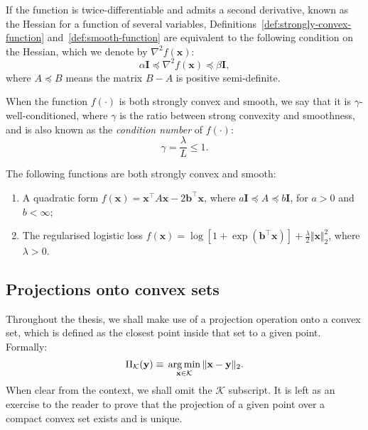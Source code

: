 If the function is twice-differentiable and admits a second derivative, known as the Hessian for a function of several variables, Definitions~\ref{def:strongly-convex-function} and~\ref{def:smooth-function} are equivalent to the following condition on the Hessian, which we denote by $\nabla^2 f(\mathbf{x})$:
\begin{equation}
\alpha\mathbf{I} \preceq \nabla^2 f(\mathbf{x}) \preceq \beta\mathbf{I},
\end{equation}
where $A \preceq B$ means the matrix $B - A$ is positive semi-definite.

When the function $f(\cdot)$ is both strongly convex and smooth, we say that it is $\gamma$-well-conditioned, where $\gamma$ is the ratio between strong convexity and smoothness, and is also known as the \emph{condition number} of $f(\cdot)$:
\begin{equation}
\gamma = \frac{\lambda}{L} \leq 1.
\end{equation}
\begin{example}
 The following functions are both strongly convex and smooth:
\begin{enumerate}
	\item A quadratic form $f(\mathbf{x}) = \mathbf{x}^\top A \mathbf{x} - 2\mathbf{b}^\top\mathbf{x}$, where $a\mathbf{I} \preceq A \preceq b\mathbf{I}$, for $a > 0$ and $b < \infty$;
	\item The regularised logistic loss $f(\mathbf{x}) = \log[1 + \exp(\mathbf{b}^\top\mathbf{x})] + \frac{\lambda}{2}\Vert\mathbf{x}\Vert_2^2$, where $\lambda > 0$.
\end{enumerate}
\end{example}

\subsection{Projections onto convex sets}
\label{sec:euclidean-projections}

Throughout the thesis, we shall make use of a projection operation onto a convex set, which is defined as the closest point inside that set to a given point. Formally:
\begin{equation}
  \Pi_\mathcal{K}(\mathbf{y})
  \equiv \, \operatorname*{arg\,min}_{\mathbf{x} \in \mathcal{K}} \Vert \mathbf{x} - \mathbf{y} \Vert_2.
\end{equation}  
When clear from the context, we shall omit the $\mathcal{K}$ subscript. It is left as an exercise to the reader to prove that the projection of a given point over a compact convex set exists and is unique.

